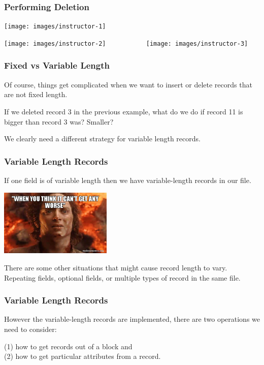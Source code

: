 \begin{frame}
\frametitle{Performing Deletion}

\begin{center}
\texttt{[image: images/instructor-1]}
\end{center}



\begin{center}
\texttt{[image: images/instructor-2]} 
~~~~~~~~~~
\texttt{[image: images/instructor-3]}
\end{center}

\end{frame}



\begin{frame}
\frametitle{Fixed vs Variable Length}

Of course, things get complicated when we want to insert or delete records that are not fixed length. 

If we deleted record 3 in the previous example, what do we do if record 11 is bigger than record 3 was? Smaller? 

We clearly need a different strategy for variable length records.


\end{frame}


\begin{frame}
\frametitle{Variable Length Records}

If one field is of variable length then we have variable-length records in our file. 

\begin{center}
	\includegraphics[width=0.4\textwidth]{images/frodo.jpg}
\end{center}

There are some other situations that might cause record length to vary.\\
\quad Repeating fields, optional fields, or multiple types of record in the same file. 

\end{frame}


\begin{frame}
\frametitle{Variable Length Records}

However the variable-length records are implemented, there are two operations we need to consider: 

(1) how to get records out of a block and\\ (2) how to get particular attributes from a record.

\end{frame}


